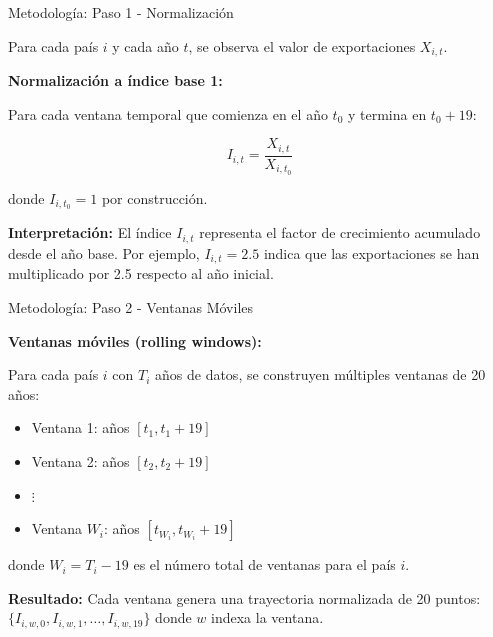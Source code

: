 \documentclass[aspectratio=169,xcolor=dvipsnames]{beamer}
\begin{document}
\begin{frame}{Metodología: Paso 1 - Normalización}

Para cada país $i$ y cada año $t$, se observa el valor de exportaciones $X_{i,t}$.

\vspace{0.3cm}

\textbf{Normalización a índice base 1:}

Para cada ventana temporal que comienza en el año $t_0$ y termina en $t_0 + 19$:

\[I_{i,t} = \frac{X_{i,t}}{X_{i,t_0}}\]

donde $I_{i,t_0} = 1$ por construcción.

\vspace{0.3cm}

\textbf{Interpretación:} El índice $I_{i,t}$ representa el factor de crecimiento acumulado desde el año base. Por ejemplo, $I_{i,t} = 2.5$ indica que las exportaciones se han multiplicado por 2.5 respecto al año inicial.

\end{frame}

\begin{frame}{Metodología: Paso 2 - Ventanas Móviles}

\textbf{Ventanas móviles (rolling windows):}

Para cada país $i$ con $T_i$ años de datos, se construyen múltiples ventanas de 20 años:

\vspace{0.3cm}

\begin{itemize}
    \item Ventana 1: años $[t_1, t_1+19]$
    \item Ventana 2: años $[t_2, t_2+19]$
    \item $\vdots$
    \item Ventana $W_i$: años $[t_{W_i}, t_{W_i}+19]$
\end{itemize}

\vspace{0.3cm}

donde $W_i = T_i - 19$ es el número total de ventanas para el país $i$.

\vspace{0.3cm}

\textbf{Resultado:} Cada ventana genera una trayectoria normalizada de 20 puntos: $\{I_{i,w,0}, I_{i,w,1}, \ldots, I_{i,w,19}\}$ donde $w$ indexa la ventana.

\end{frame}
\end{document}
